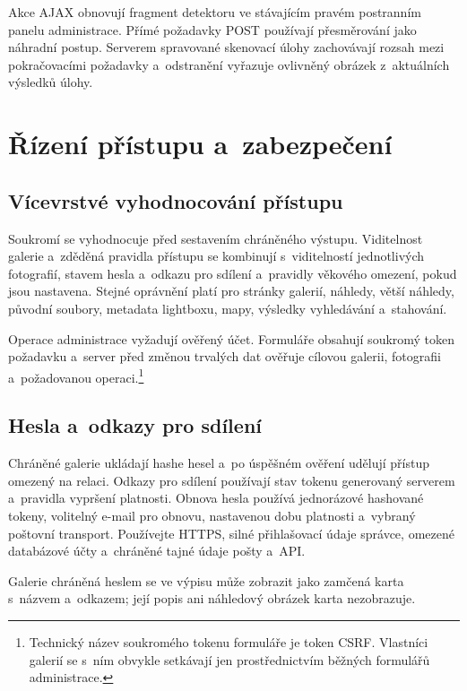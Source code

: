 \documentclass[11pt,a4paper]{article}
\begin{document}
Akce AJAX obnovují fragment detektoru ve stávajícím pravém postranním panelu
administrace. Přímé požadavky POST používají přesměrování jako náhradní postup.
Serverem spravované skenovací úlohy zachovávají rozsah mezi pokračovacími
požadavky a~odstranění vyřazuje ovlivněný obrázek z~aktuálních výsledků úlohy.
\section{Řízení přístupu a~zabezpečení}
\label{sec:security}

\subsection{Vícevrstvé vyhodnocování přístupu}

Soukromí se vyhodnocuje před sestavením chráněného výstupu. Viditelnost galerie
a~zděděná pravidla přístupu se kombinují s~viditelností jednotlivých fotografií,
stavem hesla a~odkazu pro sdílení a~pravidly věkového omezení, pokud jsou
nastavena. Stejné oprávnění platí pro stránky galerií, náhledy, větší náhledy,
původní soubory, metadata lightboxu, mapy, výsledky vyhledávání a~stahování.

Operace administrace vyžadují ověřený účet. Formuláře obsahují soukromý token
požadavku a~server před změnou trvalých dat ověřuje cílovou galerii, fotografii
a~požadovanou operaci.\footnote{Technický název soukromého tokenu formuláře je
token CSRF. Vlastníci galerií se s~ním obvykle setkávají jen prostřednictvím
běžných formulářů administrace.}

\subsection{Hesla a~odkazy pro sdílení}

Chráněné galerie ukládají hashe hesel a~po úspěšném ověření udělují přístup
omezený na relaci. Odkazy pro sdílení používají stav tokenu generovaný serverem
a~pravidla vypršení platnosti. Obnova hesla používá jednorázové hashované
tokeny, volitelný e-mail pro obnovu, nastavenou dobu platnosti a~vybraný
poštovní transport. Používejte HTTPS, silné přihlašovací údaje správce, omezené
databázové účty a~chráněné tajné údaje pošty a~API.

Galerie chráněná heslem se ve výpisu může zobrazit jako zamčená karta
s~názvem a~odkazem; její popis ani náhledový obrázek karta nezobrazuje.
\end{document}
